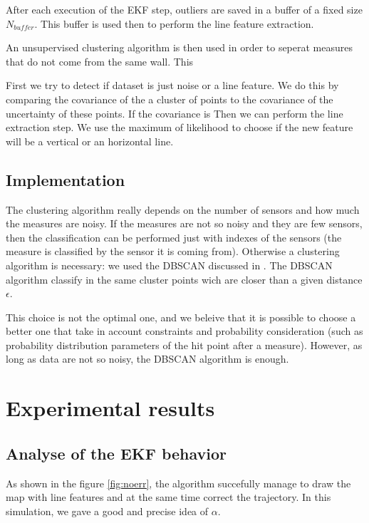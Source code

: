\documentclass[a4paper,12pt]{article}
\begin{document}
After each execution of the EKF step, outliers are saved in a buffer of a fixed size $N_{buffer}$.
This buffer is used then to perform the line feature extraction.


An unsupervised clustering algorithm is then used in order to seperat measures that do not come from the same wall. This 

First we try to detect if dataset is just noise or a line feature. We do this by comparing the covariance of the a cluster of points to the covariance of the uncertainty of these points. If the covariance is 
Then we can perform the line extraction step. We use the maximum of likelihood to choose if the new feature will be a vertical or an horizontal line. 



\subsection{Implementation}

The clustering algorithm really depends on the number of sensors and how much the measures are noisy. If the measures are not so noisy and they are few sensors, then the classification can be performed just with indexes of the sensors (the measure is classified by the sensor it is coming from).
Otherwise a clustering algorithm is necessary: we used the DBSCAN discussed in \cite{ester1996density}. The DBSCAN algorithm classify in the same cluster points wich are closer than a given distance $\epsilon$.

This choice is not the optimal one, and we beleive that it is possible to choose a better one that take in account constraints and probability consideration (such as probability distribution parameters of the hit point after a measure).
However, as long as data are not so noisy, the DBSCAN algorithm is enough.

\section{Experimental results}
\label{sec:exps}


\subsection{Analyse of the EKF behavior}
As shown in the figure \ref{fig:noerr}, the algorithm succefully manage to draw the map with line features and at the same time correct the trajectory. 
In this simulation, we gave a good and precise idea of $\alpha$. 
\end{document}
